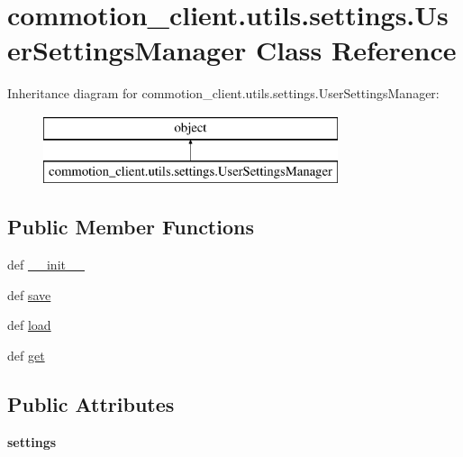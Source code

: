 \hypertarget{classcommotion__client_1_1utils_1_1settings_1_1UserSettingsManager}{\section{commotion\+\_\+client.\+utils.\+settings.\+User\+Settings\+Manager Class Reference}
\label{classcommotion__client_1_1utils_1_1settings_1_1UserSettingsManager}
}
Inheritance diagram for commotion\+\_\+client.\+utils.\+settings.\+User\+Settings\+Manager\+:\begin{figure}[H]
\begin{center}
\leavevmode
\includegraphics[height=2.000000cm]{classcommotion__client_1_1utils_1_1settings_1_1UserSettingsManager}
\end{center}
\end{figure}
\subsection*{Public Member Functions}
\begin{DoxyCompactItemize}
\item 
def \hyperlink{classcommotion__client_1_1utils_1_1settings_1_1UserSettingsManager_a51d7787bb6bdf12e72b053efc85ae14c}{\+\_\+\+\_\+init\+\_\+\+\_\+}
\item 
def \hyperlink{classcommotion__client_1_1utils_1_1settings_1_1UserSettingsManager_af215df79cfa2281e573a55bb44ca85cd}{save}
\item 
def \hyperlink{classcommotion__client_1_1utils_1_1settings_1_1UserSettingsManager_a8b3fefd45cd8d0747d32267e91d37f07}{load}
\item 
def \hyperlink{classcommotion__client_1_1utils_1_1settings_1_1UserSettingsManager_a6e67fd793c1f0c88a6d28551ba4ef4b3}{get}
\end{DoxyCompactItemize}
\subsection*{Public Attributes}
\begin{DoxyCompactItemize}
\item 
\hypertarget{classcommotion__client_1_1utils_1_1settings_1_1UserSettingsManager_aab010f5c4df9cb099aee2a9644e22058}{{\bfseries settings}}\label{classcommotion__client_1_1utils_1_1settings_1_1UserSettingsManager_aab010f5c4df9cb099aee2a9644e22058}

\end{DoxyCompactItemize}


